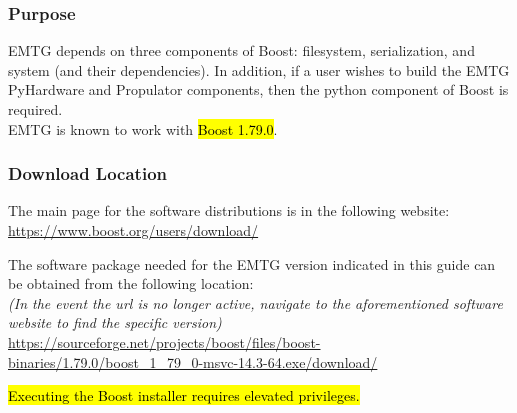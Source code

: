 
\subsubsection{Purpose}
\noindent \ac{EMTG} depends on three components of Boost: filesystem, serialization, and system (and their dependencies). In addition, if a user wishes to build the \ac{EMTG} PyHardware and Propulator components, then the python component of Boost is required. \\ \ac{EMTG} is known to work with \hl{Boost 1.79.0}.

\subsubsection{Download Location}
\noindent The main page for the software distributions is in the following website: \\
\url{https://www.boost.org/users/download/}

\noindent The software package needed for the EMTG version indicated in this guide can be obtained from the following location: \\
\emph{(In the event the url is no longer active, navigate to the aforementioned software website to find the specific version)} \\
\url{https://sourceforge.net/projects/boost/files/boost-binaries/1.79.0/boost_1_79_0-msvc-14.3-64.exe/download/}

\noindent \hl{Executing the Boost installer requires elevated privileges.}

